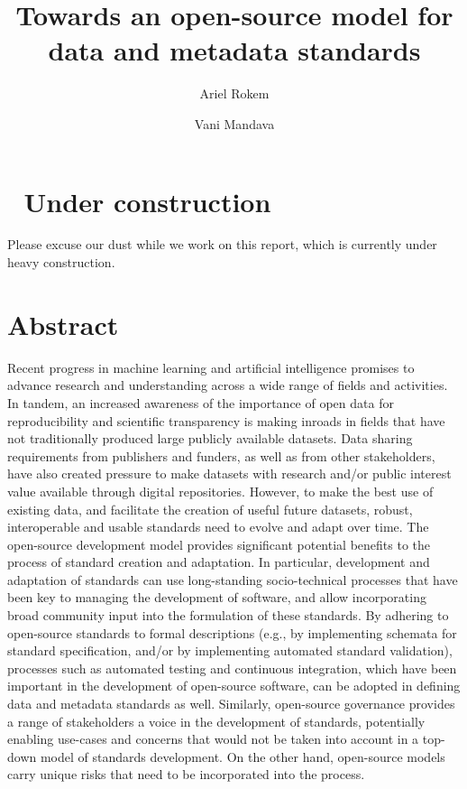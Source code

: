 \documentclass[
  letterpaper,
  DIV=11,
  numbers=noendperiod]{scrartcl}
\title{Towards an open-source model for data and metadata standards}
\author{Ariel Rokem \and Vani Mandava}
\date{}
\begin{document}
\maketitle

\section{🚧 Under construction 🚧}\label{under-construction}

Please excuse our dust while we work on this report, which is currently
under heavy construction.

\section{Abstract}\label{abstract}

Recent progress in machine learning and artificial intelligence promises
to advance research and understanding across a wide range of fields and
activities. In tandem, an increased awareness of the importance of open
data for reproducibility and scientific transparency is making inroads
in fields that have not traditionally produced large publicly available
datasets. Data sharing requirements from publishers and funders, as well
as from other stakeholders, have also created pressure to make datasets
with research and/or public interest value available through digital
repositories. However, to make the best use of existing data, and
facilitate the creation of useful future datasets, robust, interoperable
and usable standards need to evolve and adapt over time. The open-source
development model provides significant potential benefits to the process
of standard creation and adaptation. In particular, development and
adaptation of standards can use long-standing socio-technical processes
that have been key to managing the development of software, and allow
incorporating broad community input into the formulation of these
standards. By adhering to open-source standards to formal descriptions
(e.g., by implementing schemata for standard specification, and/or by
implementing automated standard validation), processes such as automated
testing and continuous integration, which have been important in the
development of open-source software, can be adopted in defining data and
metadata standards as well. Similarly, open-source governance provides a
range of stakeholders a voice in the development of standards,
potentially enabling use-cases and concerns that would not be taken into
account in a top-down model of standards development. On the other hand,
open-source models carry unique risks that need to be incorporated into
the process.
\end{document}

